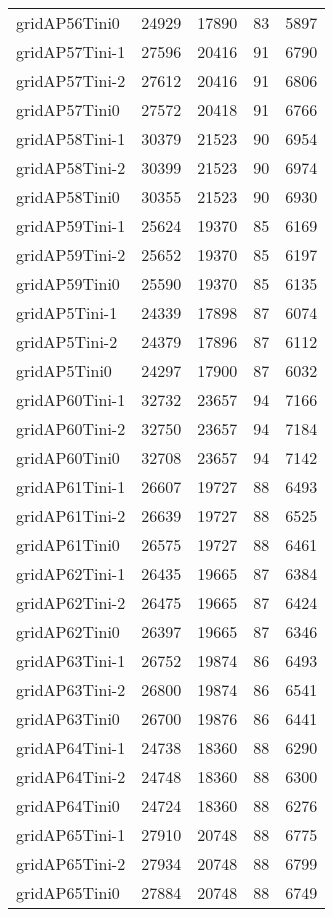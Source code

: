 \begin{longtable}{lrrrr}
gridAP56Tini0 & 24929 & 17890 & 83 & 5897 \\
gridAP57Tini-1 & 27596 & 20416 & 91 & 6790 \\
gridAP57Tini-2 & 27612 & 20416 & 91 & 6806 \\
gridAP57Tini0 & 27572 & 20418 & 91 & 6766 \\
gridAP58Tini-1 & 30379 & 21523 & 90 & 6954 \\
gridAP58Tini-2 & 30399 & 21523 & 90 & 6974 \\
gridAP58Tini0 & 30355 & 21523 & 90 & 6930 \\
gridAP59Tini-1 & 25624 & 19370 & 85 & 6169 \\
gridAP59Tini-2 & 25652 & 19370 & 85 & 6197 \\
gridAP59Tini0 & 25590 & 19370 & 85 & 6135 \\
gridAP5Tini-1 & 24339 & 17898 & 87 & 6074 \\
gridAP5Tini-2 & 24379 & 17896 & 87 & 6112 \\
gridAP5Tini0 & 24297 & 17900 & 87 & 6032 \\
gridAP60Tini-1 & 32732 & 23657 & 94 & 7166 \\
gridAP60Tini-2 & 32750 & 23657 & 94 & 7184 \\
gridAP60Tini0 & 32708 & 23657 & 94 & 7142 \\
gridAP61Tini-1 & 26607 & 19727 & 88 & 6493 \\
gridAP61Tini-2 & 26639 & 19727 & 88 & 6525 \\
gridAP61Tini0 & 26575 & 19727 & 88 & 6461 \\
gridAP62Tini-1 & 26435 & 19665 & 87 & 6384 \\
gridAP62Tini-2 & 26475 & 19665 & 87 & 6424 \\
gridAP62Tini0 & 26397 & 19665 & 87 & 6346 \\
gridAP63Tini-1 & 26752 & 19874 & 86 & 6493 \\
gridAP63Tini-2 & 26800 & 19874 & 86 & 6541 \\
gridAP63Tini0 & 26700 & 19876 & 86 & 6441 \\
gridAP64Tini-1 & 24738 & 18360 & 88 & 6290 \\
gridAP64Tini-2 & 24748 & 18360 & 88 & 6300 \\
gridAP64Tini0 & 24724 & 18360 & 88 & 6276 \\
gridAP65Tini-1 & 27910 & 20748 & 88 & 6775 \\
gridAP65Tini-2 & 27934 & 20748 & 88 & 6799 \\
gridAP65Tini0 & 27884 & 20748 & 88 & 6749 \\

\end{longtable}
